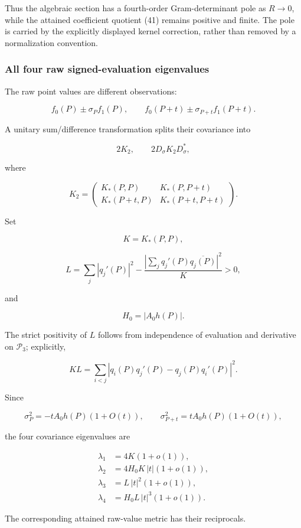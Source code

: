 Thus the algebraic section has a fourth-order Gram-determinant pole as
\(R\to0\), while the attained coefficient quotient (41) remains positive
and finite. The pole is carried by the explicitly displayed kernel
correction, rather than removed by a normalization convention.

\subsubsection{All four raw signed-evaluation
eigenvalues}\label{all-four-raw-signed-evaluation-eigenvalues}

The raw point values are different observations:

\[
f_0(P)\pm\sigma_Pf_1(P),\qquad
f_0(P+t)\pm\sigma_{P+t}f_1(P+t).
\]

A unitary sum/difference transformation splits their covariance into

\[
2K_2,\qquad
2D_\sigma K_2D_\sigma^*,
\]

where

\[
K_2=
\begin{pmatrix}
K_*(P,P)&K_*(P,P+t)\\
K_*(P+t,P)&K_*(P+t,P+t)
\end{pmatrix}.
\]

Set

\[
K=K_*(P,P),
\]

\[
L=
\sum_j|q_j'(P)|^2
-\frac{\left|\sum_jq_j'(P)\overline{q_j(P)}\right|^2}{K}>0,
\]

and

\[
H_0=|A_0h(P)|.
\]

The strict positivity of \(L\) follows from independence of evaluation
and derivative on \(\mathcal P_3\); explicitly,

\[
KL=\sum_{i<j}|q_i(P)q_j'(P)-q_j(P)q_i'(P)|^2.
\]

Since

\[
\sigma_P^2=-tA_0h(P)(1+O(t)),\qquad
\sigma_{P+t}^2=tA_0h(P)(1+O(t)),
\]

the four covariance eigenvalues are

\[
\boxed{
\begin{aligned}
\lambda_1&=4K(1+o(1)),\\
\lambda_2&=4H_0K\,|t|(1+o(1)),\\
\lambda_3&=L\,|t|^2(1+o(1)),\\
\lambda_4&=H_0L\,|t|^3(1+o(1)).
\end{aligned}}
\tag{44}
\]

The corresponding attained raw-value metric has their reciprocals.

